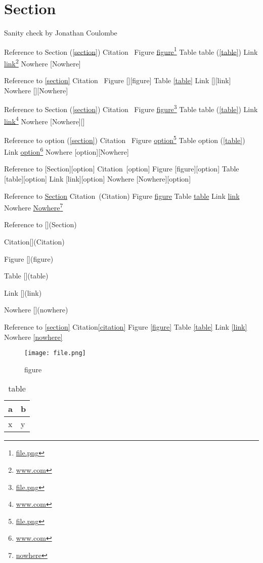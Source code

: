 
\def\mytitle{MultiMarkdown Sanity Test}
\def\latexmode{memoir}

\part{Section}
\label{section}

Sanity check by Jonathan Coulombe

Reference to Section (\autoref{section})
Citation~\citep{Citation}
Figure \href{file.png}{figure}\footnote{\href{file.png}{file.png}}
Table table (\autoref{table})
Link \href{www.com}{link}\footnote{\href{www.com}{www.com}}
Nowhere [Nowhere]

Reference to \autoref{section}
Citation~\citep{Citation}
Figure [][figure]
Table \autoref{table}
Link [][link]
Nowhere [][Nowhere]

Reference to Section (\autoref{section})
Citation~\citep{Citation}
Figure \href{file.png}{figure}\footnote{\href{file.png}{file.png}}
Table table (\autoref{table})
Link \href{www.com}{link}\footnote{\href{www.com}{www.com}}
Nowhere [Nowhere][]

Reference to option (\autoref{section})
Citation~\citep[option]{Citation}
Figure \href{file.png}{option}\footnote{\href{file.png}{file.png}}
Table option (\autoref{table})
Link \href{www.com}{option}\footnote{\href{www.com}{www.com}}
Nowhere [option][Nowhere]

Reference to [Section][option]
Citation~\citep{Citation}[option]
Figure [figure][option]
Table [table][option]
Link [link][option]
Nowhere [Nowhere][option]

Reference to \href{Section}{Section}
Citation~\citep{Citation}(Citation)
Figure \href{figure}{figure}
Table \href{table}{table}
Link \href{link}{link}
Nowhere \href{nowhere}{Nowhere}\footnote{\href{nowhere}{nowhere}}

Reference to [](Section)

Citation[](Citation)

Figure [](figure)

Table [](table)

Link [](link)

Nowhere [](nowhere)

Reference to \autoref{section}
Citation\autoref{citation}
Figure \autoref{figure}
Table \autoref{table}
Link \autoref{link}
Nowhere \autoref{nowhere}

\begin{figure}[htbp]
\centering
\texttt{[image: file.png]}
\caption{figure}
\label{figure}
\end{figure}

\begin{table}[htbp]
\begin{minipage}{\linewidth}
\setlength{\tymax}{0.5\linewidth}
\centering
\small
\caption{table}
\label{table}
\begin{tabulary}{\textwidth}{@{}LL@{}} \toprule
a&b\\
\midrule
x&y\\

\bottomrule

\end{tabulary}
\end{minipage}
\end{table}




